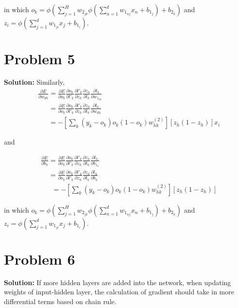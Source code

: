 \documentclass[11pt]{article}
\begin{document}
	in which $o_{k} = \phi(\sum_{j = 1}^H w_{2_{jk}}\phi(\sum_{n = 1}^d w_{1_{nj}}x_{n} + b_{1_{j}}) + b_{2_{k}})$ and $z_{i} = \phi(\sum_{j = 1}^d w_{1_{ji}}x_{j} + b_{1_{i}})$.
\section*{Problem 5}
\textbf{Solution:} Similarly,
	\begin{align}
		&\frac{\partial E}{\partial w_{dh}} = \frac{\partial E}{\partial o_k}\frac{\partial o_k}{\partial l'_k}\frac{\partial l'_k}{\partial z_h}\frac{\partial z_h}{\partial l_h}\frac{\partial l_h}{\partial w_{1_{dh}}}\nonumber\\
		&\phantom{\frac{\partial E}{\partial w_{dh}}} = \frac{\partial E}{\partial o_k}\frac{\partial o_k}{\partial l'_k}\frac{\partial l'_k}{\partial z_h}\frac{\partial z_h}{\partial l_h}\frac{\partial l_h}{\partial w_{dh}}\nonumber\\
		&\phantom{\frac{\partial E}{\partial w_{hk}}} = - \left[\sum_k(y_k - o_k)o_k(1 - o_k)w^{(2)}_{hk}\right][z_{h}(1 - z_{h})]x_i\nonumber
	\end{align}
	
	and 
	
	\begin{align}
		&\frac{\partial E}{\partial b_{h}} = \frac{\partial E}{\partial o_k}\frac{\partial o_k}{\partial l'_k}\frac{\partial l'_k}{\partial z_h}\frac{\partial z_h}{\partial l_h}\frac{\partial l_h}{\partial b_{1_h}}\nonumber\\
		&\phantom{\frac{\partial E}{\partial b_{h}}} = \frac{\partial E}{\partial o_k}\frac{\partial o_k}{\partial l'_k}\frac{\partial l'_k}{\partial z_h}\frac{\partial z_h}{\partial l_h}\frac{\partial l_h}{\partial b_{h}}\nonumber\\
		&\phantom{\frac{\partial E}{\partial w_{hk}}} = - \left[\sum_k (y_k - o_k)o_k(1 - o_k)w^{(2)}_{hk}\right][z_{h}(1 - z_{h})]\nonumber
	\end{align}
	
	in which $o_{k} = \phi(\sum_{j = 1}^H w_{2_{jk}}\phi(\sum_{n = 1}^d w_{1_{nj}}x_{n} + b_{1_{j}}) + b_{2_{k}})$ and $z_{i} = \phi(\sum_{j = 1}^d w_{1_{ji}}x_{j} + b_{1_{i}})$.
\section*{Problem 6}
\textbf{Solution:} If more hidden layers are added into the network, when updating weights of input-hidden layer, the calculation of gradient should take in more differential terms based on chain rule.
\newpage \nocite{*}


\end{document}
